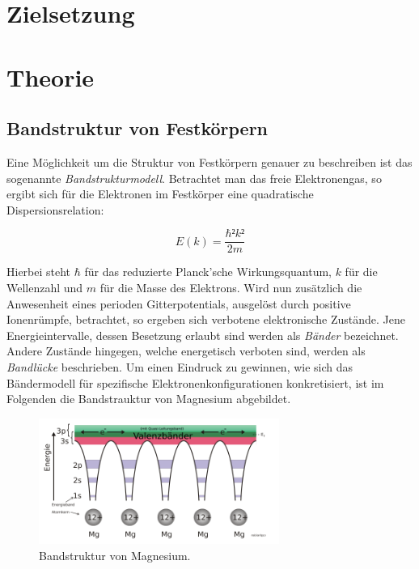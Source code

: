 


\section{Zielsetzung}
\label{sec:Theorie}

\section{Theorie}

\subsection{Bandstruktur von Festkörpern}

\noindent Eine Möglichkeit um die Struktur von Festkörpern genauer zu beschreiben ist das sogenannte \textit{Bandstrukturmodell}. Betrachtet man das 
freie Elektronengas, so ergibt sich für die Elektronen im Festkörper eine quadratische Dispersionsrelation:

\begin{equation}
    E(k) = \frac{\hbar²{}k²}{2m}
\end{equation}

\noindent Hierbei steht $\hbar$ für das reduzierte Planck'sche Wirkungsquantum, $k$ für die Wellenzahl und $m$ für die Masse des Elektrons.
Wird nun zusätzlich die Anwesenheit eines perioden Gitterpotentials, ausgelöst durch positive Ionenrümpfe, betrachtet, so ergeben sich verbotene
elektronische Zustände. Jene Energieintervalle, dessen Besetzung erlaubt sind werden als \textit{Bänder} bezeichnet. Andere Zustände hingegen, welche
energetisch verboten sind, werden als \textit{Bandlücke} beschrieben. Um einen Eindruck zu gewinnen, wie sich das Bändermodell für spezifische
Elektronenkonfigurationen konkretisiert, ist im Folgenden die Bandstrauktur von Magnesium abgebildet. 

\begin{figure}[H]
    \centering
    \includegraphics[width=0.7\textwidth]{BandstrukturMagn.png}
    \caption{Bandstruktur von Magnesium.}
    \label{fig:Magnesium}
\end{figure}

